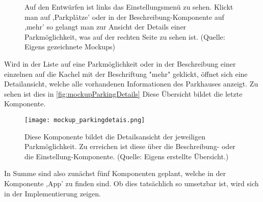 \begin{figure}[h!]
	\centering
	\qquad
	\caption[Auf den Entwürfen ist links das Einstellungsmenü zu sehen. Klickt man auf ,Parkplätze' oder in der Beschreibung-Komponente auf ,mehr' so gelangt man zur Ansicht der Details einer Parkmöglichkeit, was auf der rechten Seite zu sehen ist.]{Auf den Entwürfen ist links das Einstellungsmenü zu sehen. Klickt man auf ,Parkplätze' oder in der Beschreibung-Komponente auf ,mehr' so gelangt man zur Ansicht der Details einer Parkmöglichkeit, was auf der rechten Seite zu sehen ist. (Quelle: Eigens gezeichnete Mockups)}
\label{fig:mockupSettings}
\label{fig:mockupParkingList}
\end{figure}
\newpage
Wird in der Liste auf eine Parkmöglichkeit oder in der Beschreibung einer einzelnen auf die Kachel mit der Beschriftung "mehr" geklickt, öffnet sich eine Detailansicht, welche alle vorhandenen Informationen des Parkhauses anzeigt. Zu sehen ist dies in \autoref{fig:mockupParkingDetails} Diese Übersicht bildet die letzte Komponente. 

\begin{figure}[h!]
	\centering
	\texttt{[image: mockup\_parkingdetais.png]}
	\caption[Diese Komponente bildet die Detailsansicht der jeweiligen Parkmöglichkeit. Zu erreichen ist diese über die Beschreibung- oder die Einstellung-Komponente.]
	{Diese Komponente bildet die Detailsansicht der jeweiligen Parkmöglichkeit. Zu erreichen ist diese über die Beschreibung- oder die Einstellung-Komponente. (Quelle: Eigens erstellte Übersicht.)}
	\label{fig:mockupParkingDetails}
\end{figure}
\newpage
In Summe sind also zunächst fünf Komponenten geplant, welche in der Komponente ,App' zu finden sind. Ob dies tatsächlich so umsetzbar ist, wird sich in der Implementierung zeigen.

